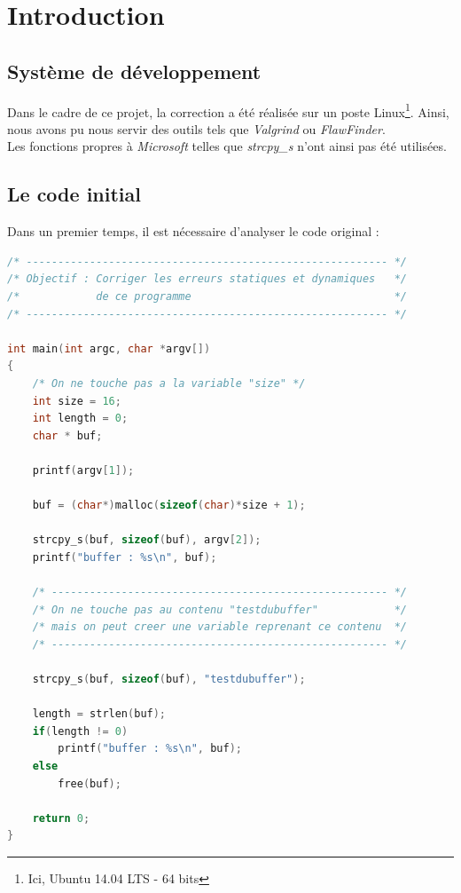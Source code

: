 \section{Introduction}
\subsection{Système de développement}

Dans le cadre de ce projet, la correction a été réalisée sur un poste Linux\footnote{Ici, Ubuntu 14.04 LTS - 64 bits}. Ainsi, nous avons pu nous servir des outils tels que \textit{Valgrind} ou \textit{FlawFinder}.\\
Les fonctions propres à \textit{Microsoft} telles que \textit{strcpy\_s} n'ont ainsi pas été utilisées.

\subsection{Le code initial}

Dans un premier temps, il est nécessaire d'analyser le code original :
\begin{lstlisting}[language=C]
/* --------------------------------------------------------- */
/* Objectif : Corriger les erreurs statiques et dynamiques   */
/*            de ce programme                                */
/* --------------------------------------------------------- */

int main(int argc, char *argv[])
{
    /* On ne touche pas a la variable "size" */
    int size = 16;
    int length = 0;
    char * buf;
	
    printf(argv[1]);
	
    buf = (char*)malloc(sizeof(char)*size + 1);
	
    strcpy_s(buf, sizeof(buf), argv[2]);
    printf("buffer : %s\n", buf);
	
    /* ----------------------------------------------------- */
    /* On ne touche pas au contenu "testdubuffer"            */
    /* mais on peut creer une variable reprenant ce contenu  */
    /* ----------------------------------------------------- */
	
    strcpy_s(buf, sizeof(buf), "testdubuffer");
	
    length = strlen(buf);
    if(length != 0)
        printf("buffer : %s\n", buf);
    else
        free(buf);
		
    return 0;
}
\end{lstlisting}
